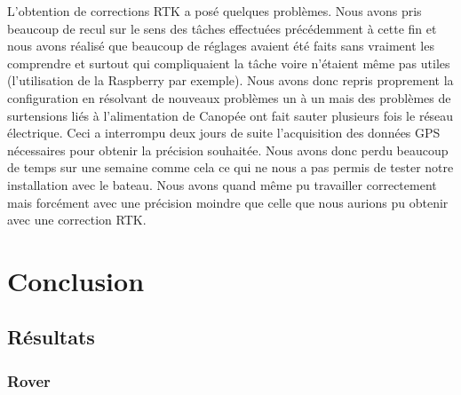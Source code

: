 \documentclass[12pt]{report}
\begin{document}
L'obtention de corrections RTK a posé quelques problèmes. Nous avons pris beaucoup de recul sur le sens des tâches effectuées précédemment à cette fin et nous avons réalisé que 
beaucoup de réglages avaient été faits sans vraiment les comprendre et surtout qui compliquaient la tâche voire n'étaient même pas utiles (l'utilisation de la Raspberry par exemple).
Nous avons donc repris proprement la configuration en résolvant de nouveaux problèmes un à un mais des problèmes de surtensions liés à l'alimentation de Canopée ont fait sauter plusieurs fois le réseau électrique.
Ceci a interrompu deux jours de suite l'acquisition des données GPS nécessaires pour obtenir la précision souhaitée. Nous avons donc perdu beaucoup de temps sur une semaine comme cela ce qui ne nous a pas permis de tester notre installation avec le bateau.
Nous avons quand même pu travailler correctement mais forcément avec une précision moindre que celle que nous aurions pu obtenir avec une correction RTK.



\chapter{Conclusion}
\section{Résultats}

\subsection{Rover}
\end{document}
